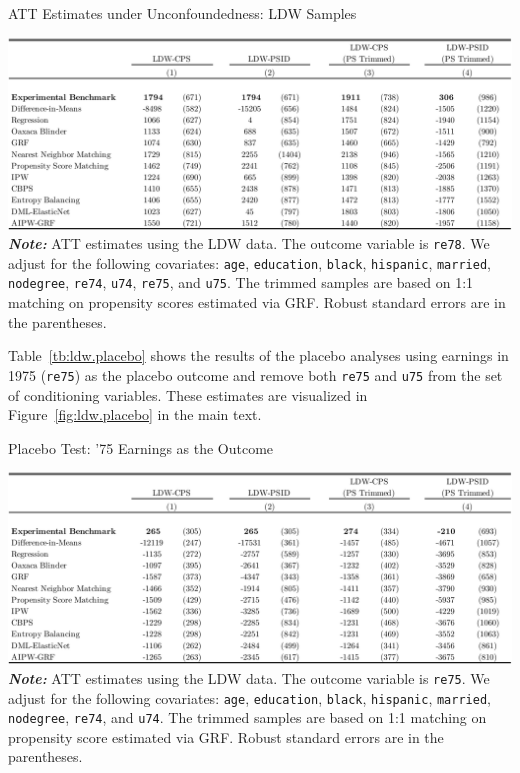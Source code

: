 \documentclass[letterpaper,12pt,leqno]{article}
\begin{document}
\begin{table}[!ht]
\caption{ATT Estimates under Unconfoundedness: LDW Samples}\label{tb:ldw.est}
\begin{minipage}[c]{1\textwidth}
\vspace{-0.5em}\includegraphics[width=\linewidth]{ldw.pdf}
{\footnotesize\textbf{\textit{Note:}} ATT estimates using the LDW data. The outcome variable is \texttt{re78}. We adjust for the following covariates: \texttt{age}, \texttt{education}, \texttt{black}, \texttt{hispanic}, \texttt{married}, \texttt{nodegree}, \texttt{re74}, \texttt{u74}, \texttt{re75}, and \texttt{u75}. The trimmed samples are based on 1:1 matching on propensity scores estimated via GRF. Robust standard errors are in the parentheses.}
\end{minipage}%
\end{table}

\clearpage

Table~\ref{tb:ldw.placebo} shows the results of the placebo analyses using earnings in 1975 (\texttt{re75}) as the placebo outcome and remove both \texttt{re75} and \texttt{u75} from the set of conditioning variables. These estimates are visualized in Figure~\ref{fig:ldw.placebo} in the main text.

\begin{table}[!ht]
\caption{Placebo Test: '75 Earnings as the Outcome}\label{tb:ldw.placebo}
\begin{minipage}[c]{1\textwidth}
\vspace{-0.5em}\includegraphics[width=\linewidth]{ldw_placebo.pdf}
{\footnotesize\textbf{\textit{Note:}} ATT estimates using the LDW data. The outcome variable is \texttt{re75}. We adjust for the following covariates: \texttt{age}, \texttt{education}, \texttt{black}, \texttt{hispanic}, \texttt{married}, \texttt{nodegree}, \texttt{re74}, and \texttt{u74}.  The trimmed samples are based on 1:1 matching on propensity score estimated via GRF. Robust standard errors are in the parentheses.}
\end{minipage}%
\end{table}
\end{document}
